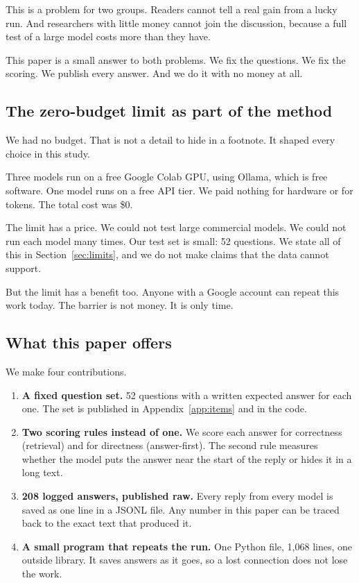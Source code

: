 \documentclass[11pt,a4paper]{article}
\begin{document}
This is a problem for two groups. Readers cannot tell a real gain from a lucky run. And researchers with little money cannot join the discussion, because a full test of a large model costs more than they have.

This paper is a small answer to both problems. We fix the questions. We fix the scoring. We publish every answer. And we do it with no money at all.

\subsection{The zero-budget limit as part of the method}

We had no budget. That is not a detail to hide in a footnote. It shaped every choice in this study.

Three models run on a free Google Colab GPU, using Ollama, which is free software. One model runs on a free API tier. We paid nothing for hardware or for tokens. The total cost was \$0.

The limit has a price. We could not test large commercial models. We could not run each model many times. Our test set is small: 52 questions. We state all of this in Section~\ref{sec:limits}, and we do not make claims that the data cannot support.

But the limit has a benefit too. Anyone with a Google account can repeat this work today. The barrier is not money. It is only time.

\subsection{What this paper offers}

We make four contributions.

\begin{enumerate}
  \item \textbf{A fixed question set.} 52 questions with a written expected answer for each one. The set is published in Appendix~\ref{app:items} and in the code.
  \item \textbf{Two scoring rules instead of one.} We score each answer for correctness (retrieval) and for directness (answer-first). The second rule measures whether the model puts the answer near the start of the reply or hides it in a long text.
  \item \textbf{208 logged answers, published raw.} Every reply from every model is saved as one line in a JSONL file. Any number in this paper can be traced back to the exact text that produced it.
  \item \textbf{A small program that repeats the run.} One Python file, 1,068 lines, one outside library. It saves answers as it goes, so a lost connection does not lose the work.
\end{enumerate}
\end{document}

